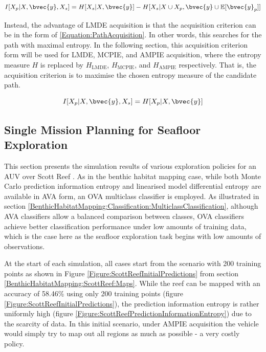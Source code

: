 			\begin{equation}
				I[X_{p} | X, \bvec{y}, X_{s}] = H[X_{s} | X, \bvec{y}] - H[X_{s} | X \cup X_{p}, \bvec{y} \cup \mathbb{E}[\bvec{y}_{p}]]
			\label{Equation:DifferentialAcquisition}
			\end{equation}
			
			Instead, the advantage of LMDE acquisition is that the acquisition criterion can be in the form of \eqref{Equation:PathAcquisition}. In other words, this searches for the path with maximal entropy. In the following section, this acquisition criterion form will be used for LMDE, MCPIE, and AMPIE acquisition, where the entropy measure $H$ is replaced by $H_{\mathrm{LMDE}}$, $H_{\mathrm{MCPIE}}$, and $H_{\mathrm{AMPIE}}$ respectively. That is, the acquisition criterion is to maximise the chosen entropy measure of the candidate path.

			\begin{equation}
				I[X_{p} | X, \bvec{y}, X_{s}] = H[X_{p} | X, \bvec{y}]
			\label{Equation:PathAcquisition}
			\end{equation}
						
		\subsection{Single Mission Planning for Seafloor Exploration}
		\label{InformativeSeafloorExploration:ScottReef:SingleMission}
					
			This section presents the simulation results of various exploration policies for an AUV over Scott Reef \citep{IMOS}. As in the benthic habitat mapping case, while both Monte Carlo prediction information entropy and linearised model differential entropy are available in AVA form, an OVA multiclass classifier is employed. As illustrated in section \ref{BenthicHabitatMapping:Classification:MulticlassClassification}, although AVA classifiers allow a balanced comparison between classes, OVA classifiers achieve better classification performance under low amounts of training data, which is the case here as the seafloor exploration task begins with low amounts of observations.
			
			At the start of each simulation, all cases start from the scenario with 200 training points as shown in Figure \ref{Figure:ScottReefInitialPredictions} from section \ref{BenthicHabitatMapping:ScottReef:Maps}. While the reef can be mapped with an accuracy of 58.46\% using only 200 training points (figure \ref{Figure:ScottReefInitialPredictions}), the prediction information entropy is rather uniformly high (figure \ref{Figure:ScottReefPredictionInformationEntropy}) due to the scarcity of data. In this initial scenario, under AMPIE acquisition the vehicle would simply try to map out all regions as much as possible - a very costly policy. 

